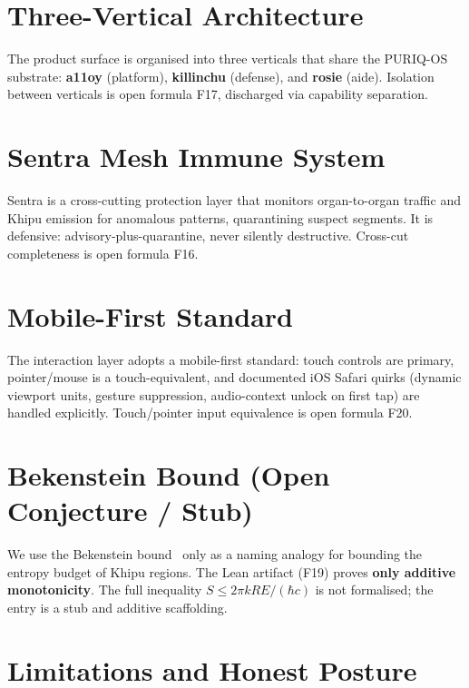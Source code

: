 \documentclass[11pt]{article}
\theoremstyle{plain}
\theoremstyle{definition}
\theoremstyle{remark}
\begin{document}
\section{Three-Vertical Architecture}
\label{sec:verticals}
The product surface is organised into three verticals that share the PURIQ-OS substrate:
\textbf{a11oy} (platform), \textbf{killinchu} (defense), and \textbf{rosie} (aide).
Isolation between verticals is open formula F17, discharged via capability separation.

\section{Sentra Mesh Immune System}
\label{sec:sentra}
Sentra is a cross-cutting protection layer that monitors organ-to-organ traffic and Khipu
emission for anomalous patterns, quarantining suspect segments. It is defensive:
advisory-plus-quarantine, never silently destructive. Cross-cut completeness is open
formula F16.

\section{Mobile-First Standard}
\label{sec:mobile}
The interaction layer adopts a mobile-first standard: touch controls are primary,
pointer/mouse is a touch-equivalent, and documented iOS Safari quirks (dynamic viewport
units, gesture suppression, audio-context unlock on first tap) are handled explicitly.
Touch/pointer input equivalence is open formula F20.

\section{Bekenstein Bound (Open Conjecture / Stub)}
\label{sec:bekenstein}
We use the Bekenstein bound~\cite{bekenstein1981} only as a naming analogy for bounding
the entropy budget of Khipu regions. The Lean artifact (F19) proves \textbf{only additive
monotonicity}. The full inequality $S\le 2\pi kRE/(\hbar c)$ is not formalised; the entry
is a stub and additive scaffolding.

\section{Limitations and Honest Posture}
\label{sec:limits}
\end{document}
